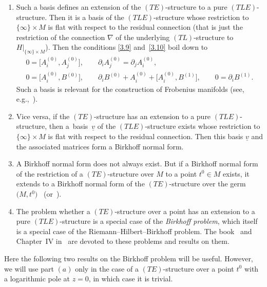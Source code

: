 \documentclass[10pt,a4paper]{amsart}
\numberwithin{equation}{section}
\numberwithin{figure}{section}
\newcommand{\uuuu}{\underline}
\newcommand{\paa}{\partial}
\newcommand{\nnn}{\nabla}
\begin{document}
\begin{Remarks}\label{t3.19}\qquad
\begin{enumerate}\itemsep=0pt
\item[$(i)$] Such a basis defines an extension of the
$(TE)$-structure to a pure $(TLE)$-structure.
Then it is a basis of the $(TLE)$-structure
whose restriction
to $\{\infty\}\times M$ is flat with respect to the
residual connection (that is just the restriction
of the connection $\nnn$ of the underlying $(TL)$-structure
to~$H|_{\{\infty\}\times M}$). Then the conditions
\eqref{3.9} and~\eqref{3.10} boil down to
\begin{gather}\label{3.27}
0= \big[A_i^{(0)},A_j^{(0)}\big],\qquad
\paa_iA_j^{(0)}=\paa_jA_i^{(0)},
\\
0= \big[A_i^{(0)},B^{(0)}\big],\qquad
\paa_iB^{(0)}+A_i^{(0)}+\big[A_i^{(0)},B^{(1)}\big],\qquad
0=\paa_iB^{(1)}.\label{3.28}
\end{gather}
Such a basis is relevant for the construction of
Frobenius manifolds (see, e.g.,~\cite{DH20-2}).

\item[$(ii)$] Vice versa, if the $(TE)$-structure has an extension
to a pure $(TLE)$-structure, then a~basis~$\uuuu{v}$
of the $(TLE)$-structure exists whose restriction to
$\{\infty\}\times M$ is flat with respect to the
residual connection.
Then this basis $\uuuu{v}$ and the associated matrices
form a Birkhoff normal form.

\item[$(iii)$] A Birkhoff normal form does not always exist.
But if a Birkhoff normal form of the restriction of
a $(TE)$-structure over $M$ to a point $t^0\in M$
exists, it extends to a Birkhoff normal form
of the $(TE)$-structure over the germ $\big(M,t^0\big)$~\cite[Chapter~VI, Theorem~2.1]{Sa02}
(or~\cite[Theorem~5.1(c)]{DH20-2}).

\item[$(iv)$] The problem whether a $(TE)$-structure over a point
has an extension to a pure $(TLE)$-structure is a
special case of the {\it Birkhoff problem},
which itself is a special case of the Riemann--Hilbert--Birkhoff
problem. The book~\cite{AB94} and Chapter~IV in~\cite{Sa02} are devoted to these problems and results
on them.
\end{enumerate}
\end{Remarks}

Here the following two results on the Birkhoff problem will
be useful. However, we will use part $(a)$ only in the
case of a $(TE)$-structure over a point $t^0$ with
a logarithmic pole at $z=0$, in which case it is trivial.
\end{document}
